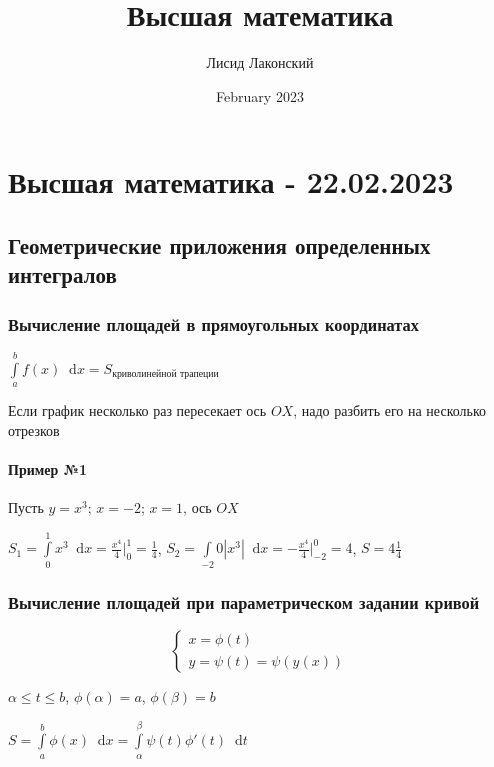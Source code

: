 \documentclass{article}
\title{Высшая математика}
\author{Лисид Лаконский}
\date{February 2023}
\newcommand*\diff{\mathop{}\!\mathrm{d}}
\begin{document}
\raggedright

\maketitle

\tableofcontents
\pagebreak

\section{Высшая математика - 22.02.2023}

\subsection{Геометрические приложения определенных интегралов}

\subsubsection{Вычисление площадей в прямоугольных координатах}

$\int\limits_{a}^{b} f(x) \diff x = S_{\text{криволинейной трапеции}}$

Если график несколько раз пересекает ось $OX$, надо разбить его на несколько отрезков

\paragraph{Пример №1} Пусть $y = x^3$; $x = -2$; $x = 1$, ось $OX$

$S_1 = \int\limits_{0}^{1} x^3 \diff x = \frac{x^4}{4} \bigg|_{0}^{1} = \frac{1}{4}$, $S_2 = \int\limits_{-2}{0} |x^3| \diff x = -\frac{x^4}{4} \bigg|_{-2}^{0} = 4$, $S = 4 \frac{1}{4}$

\subsubsection{Вычисление площадей при параметрическом задании кривой}

\begin{equation}
\begin{cases}
    x = \phi(t) \\
    y = \psi(t) = \psi(y(x))
\end{cases}
\end{equation}

$\alpha \le t \le b$, $\phi(\alpha) = a$, $\phi(\beta) = b$

$S = \int\limits_{a}^{b} \phi(x) \diff x = \int\limits_{\alpha}^{\beta} \psi (t) \phi'(t) \diff t$
\end{document}
